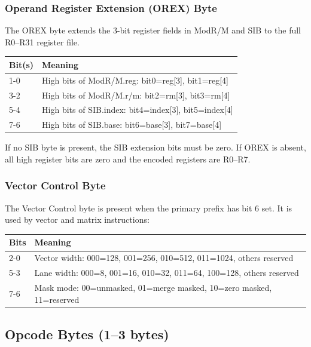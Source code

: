 \documentclass[11pt]{article}
\begin{document}
\subsubsection{Operand Register Extension (OREX) Byte}

The OREX byte extends the 3-bit register fields in ModR/M and SIB to the full R0--R31 register file.

\begin{table}[h]
\centering
\begin{tabular}{@{}ll@{}}
\toprule
\textbf{Bit(s)} & \textbf{Meaning} \\ \midrule
1-0 & High bits of ModR/M.reg: bit0=reg[3], bit1=reg[4] \\
3-2 & High bits of ModR/M.r/m: bit2=rm[3], bit3=rm[4] \\
5-4 & High bits of SIB.index: bit4=index[3], bit5=index[4] \\
7-6 & High bits of SIB.base: bit6=base[3], bit7=base[4] \\ \bottomrule
\end{tabular}
\end{table}

If no SIB byte is present, the SIB extension bits must be zero. If OREX is absent, all high register bits are zero and the encoded registers are R0--R7.

\subsubsection{Vector Control Byte}

The Vector Control byte is present when the primary prefix has bit 6 set. It is used by vector and matrix instructions:

\begin{table}[h]
\centering
\begin{tabular}{@{}ll@{}}
\toprule
\textbf{Bits} & \textbf{Meaning} \\ \midrule
2-0 & Vector width: 000=128, 001=256, 010=512, 011=1024, others reserved \\
5-3 & Lane width: 000=8, 001=16, 010=32, 011=64, 100=128, others reserved \\
7-6 & Mask mode: 00=unmasked, 01=merge masked, 10=zero masked, 11=reserved \\ \bottomrule
\end{tabular}
\end{table}

\subsection{Opcode Bytes (1--3 bytes)}
\end{document}
